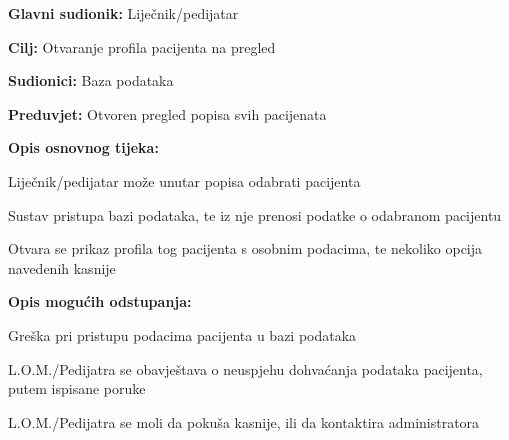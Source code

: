 					\noindent {}
					\begin{packed_item}
						
						\item \textbf{Glavni sudionik: }Liječnik/pedijatar
						\item  \textbf{Cilj:} Otvaranje profila pacijenta na pregled
						\item  \textbf{Sudionici:} Baza podataka
						\item  \textbf{Preduvjet:} Otvoren pregled popisa svih pacijenata
						\item  \textbf{Opis osnovnog tijeka:}
						
						\item[] \begin{packed_enum}
							
							\item Liječnik/pedijatar može unutar popisa odabrati pacijenta
							\item Sustav pristupa bazi podataka, te iz nje prenosi podatke o odabranom pacijentu
							\item Otvara se prikaz profila tog pacijenta s osobnim podacima, te nekoliko opcija navedenih kasnije
						\end{packed_enum}
						\item  \textbf{Opis mogućih odstupanja:}
						\item[] \begin{packed_item}
							
							\item[2.a] Greška pri pristupu podacima pacijenta u bazi podataka
							\item[] \begin{packed_enum}
								
								\item L.O.M./Pedijatra se obavještava o neuspjehu dohvaćanja podataka pacijenta, putem ispisane poruke
								\item L.O.M./Pedijatra se moli da pokuša kasnije, ili da kontaktira administratora
								
							\end{packed_enum}
						\end{packed_item}
					\end{packed_item}
					
